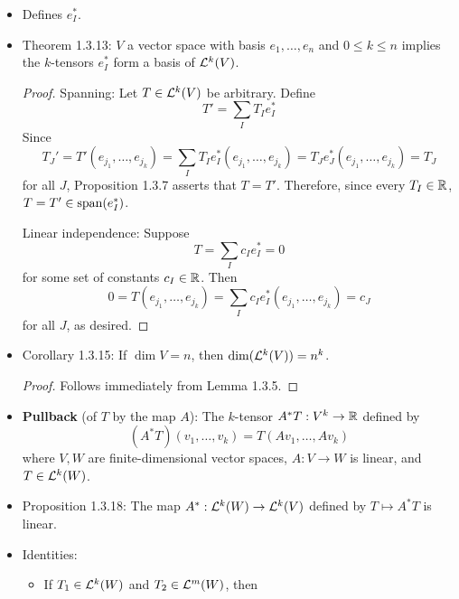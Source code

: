 \documentclass[../notes.tex]{subfiles}
\begin{document}
\begin{itemize}
\begin{equation*}
    \end{equation*}
    \item Defines $e_I^*$.
    \item Theorem 1.3.13: $V$ a vector space with basis $e_1,\dots,e_n$ and $0\leq k\leq n$ implies the $k$-tensors $e_I^*$ form a basis of $\lin[k]{V}$.
    \begin{proof}
        Spanning: Let $T\in\lin[k]{V}$ be arbitrary. Define
        \begin{equation*}
            T' = \sum_IT_Ie_I^*
        \end{equation*}
        Since
        \begin{equation*}
            T_J' = T'(e_{j_1},\dots,e_{j_k})
            = \sum_IT_Ie_I^*(e_{j_1},\dots,e_{j_k})
            = T_Je_J^*(e_{j_1},\dots,e_{j_k})
            = T_J
        \end{equation*}
        for all $J$, Proposition 1.3.7 asserts that $T=T'$. Therefore, since every $T_I\in\R$, $T=T'\in\spn(e_I^*)$.\par
        Linear independence: Suppose
        \begin{equation*}
            T = \sum_Ic_Ie_I^* = 0
        \end{equation*}
        for some set of constants $c_I\in\R$. Then
        \begin{equation*}
            0 = T(e_{j_1},\dots,e_{j_k})
            = \sum_Ic_Ie_I^*(e_{j_1},\dots,e_{j_k})
            = c_J
        \end{equation*}
        for all $J$, as desired.
    \end{proof}
    \item Corollary 1.3.15: If $\dim V=n$, then $\dim(\lin[k]{V})=n^k$.
    \begin{proof}
        Follows immediately from Lemma 1.3.5.
    \end{proof}
    \item \textbf{Pullback} (of $T$ by the map $A$): The $k$-tensor $A^*T:V^k\to\R$ defined by
    \begin{equation*}
        (A^*T)(v_1,\dots,v_k) = T(Av_1,\dots,Av_k)
    \end{equation*}
    where $V,W$ are finite-dimensional vector spaces, $A:V\to W$ is linear, and $T\in\lin[k]{W}$.
    \item Proposition 1.3.18: The map $A^*:\lin[k]{W}\to\lin[k]{V}$ defined by $T\mapsto A^*T$ is linear.
    \item Identities:
    \begin{itemize}
        \item If $T_1\in\lin[k]{W}$ and $T_2\in\lin[m]{W}$, then

\end{itemize}
\end{itemize}
\end{document}
